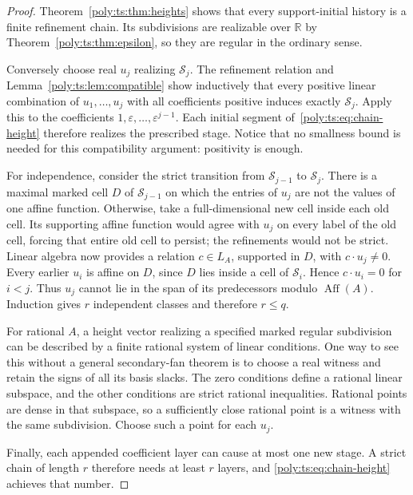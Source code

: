 \documentclass[11pt,a4paper]{article}
\numberwithin{equation}{section}
\theoremstyle{plain}
\newcommand{\R}{\mathbb R}
\newcommand{\eps}{\varepsilon}
\newcommand{\Aff}{\operatorname{Aff}}
\begin{document}
\begin{proof}
Theorem~\ref{poly:ts:thm:heights} shows that every support-initial history is a
finite refinement chain. Its subdivisions are realizable over $\R$ by
Theorem~\ref{poly:ts:thm:epsilon}, so they are regular in the ordinary sense.

Conversely choose real $u_j$ realizing $\mathcal S_j$. The refinement
relation and Lemma~\ref{poly:ts:lem:compatible} show inductively that every
positive linear combination of $u_1,\ldots,u_j$ with all coefficients
positive induces exactly $\mathcal S_j$. Apply this to the coefficients
$1,\eps,\ldots,\eps^{j-1}$. Each initial segment of~\eqref{poly:ts:eq:chain-height}
therefore realizes the prescribed stage. Notice that no smallness bound
is needed for this compatibility argument: positivity is enough.

For independence, consider the strict transition from
$\mathcal S_{j-1}$ to $\mathcal S_j$. There is a maximal marked cell
$D$ of $\mathcal S_{j-1}$ on which the entries of $u_j$ are not the
values of one affine function. Otherwise, take a full-dimensional new
cell inside each old cell. Its supporting affine function would agree
with $u_j$ on every label of the old cell, forcing that entire old cell
to persist; the refinements would not be strict. Linear algebra now
provides a relation $c\in L_A$, supported in $D$, with $c\cdot u_j\ne0$.
Every earlier $u_i$ is affine on $D$, since $D$ lies inside a cell of
$\mathcal S_i$. Hence $c\cdot u_i=0$ for $i<j$. Thus $u_j$ cannot lie
in the span of its predecessors modulo $\Aff(A)$. Induction gives
$r$ independent classes and therefore $r\le q$.

For rational $A$, a height vector realizing a specified marked regular
subdivision can be described by a finite rational system of linear
conditions. One way to see this without a general secondary-fan theorem
is to choose a real witness and retain the signs of all its basis slacks.
The zero conditions define a rational linear subspace, and the other
conditions are strict rational inequalities. Rational points are dense
in that subspace, so a sufficiently close rational point is a witness
with the same subdivision. Choose such a point for each $u_j$.

Finally, each appended coefficient layer can cause at most one new stage.
A strict chain of length $r$ therefore needs at least $r$ layers, and
\eqref{poly:ts:eq:chain-height} achieves that number.
\end{proof}
\end{document}
